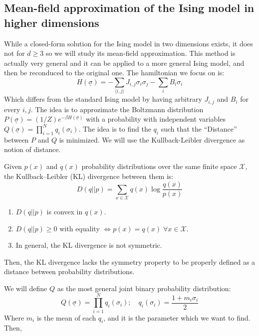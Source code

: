 \subsection{Mean-field approximation of the Ising model in higher dimensions}
While a closed-form solution for the Ising model in two dimensions exists, it does not for $d\geq 3$ so we will study its mean-field approximation. This method is actually very general and it can be applied to a more general Ising model, and then be reconduced to the original one. The hamiltonian we focus on is:
\begin{equation}
    H(\underline{\sigma}) = -\sum_{\langle i,j\rangle}J_{i,j}\sigma_i\sigma_j - \sum_i B_i\sigma_i
\end{equation}
Which differs from the standard Ising model by having arbitrary $J_{i,j}$ and $B_i$ for every $i,j$. The idea is to approzimate the Boltzmann distribution $P(\underline{\sigma}) = (1/Z)e^{-\beta H(\underline{\sigma})}$ with a probability with independent variables $Q(\underline{\sigma})= \prod_{i=1}^Nq_i(\sigma_i)$. The idea is to find the $q_i$ such that the ``Distance'' between $P$ and $Q$ is minimized. We will use the Kullback-Leibler divergence as notion of distance.
\begin{definition}
    Given $p(x)$ and $q(x)$ probability distributions over the same finite space $\mathcal{X}$, the Kullback–Leibler (KL) divergence between them is:
    $$D(q||p) = \sum_{x\in\mathcal{X}}q(x)\log\frac{q(x)}{p(x)}$$
\end{definition}
\begin{remark}
    \hfill
    \begin{enumerate}
        \item $D(q||p)$ is convex in $q(x)$.
        \item $D(q||p)\geq 0$ with equality $ \iff p(x)=q(x) \;\forall x\in\mathcal{X}$.
        \item In general, the KL divergence is not symmetric.
    \end{enumerate}
    Then, the KL divergence lacks the symmetry property to be properly defined as a distance between probability distributions.
\end{remark}
We will define $Q$ as the most general joint binary probability distribution:
\begin{equation}
    Q(\underline{\sigma}) = \prod_{i=1}^{N}q_i(\sigma_i); \quad
    q_i(\sigma_i)=\frac{1+m_i\sigma_i}{2}
\end{equation}
Where $m_i$ is the mean of each $q_i$, and it is the parameter which we want to find. Then,
